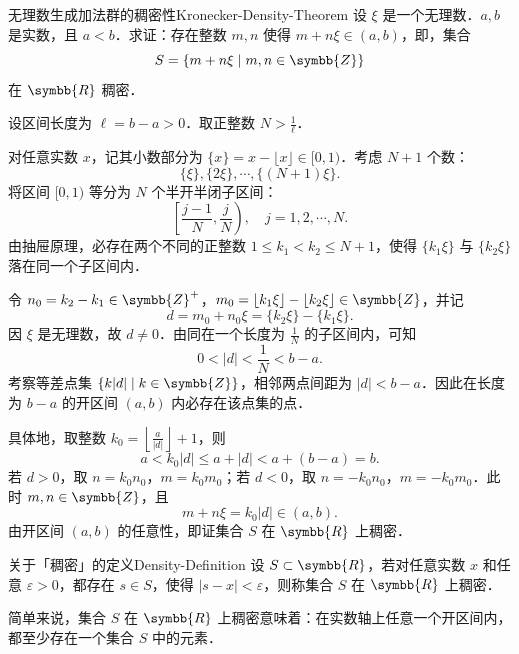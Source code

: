 \begin{problem}{无理数生成加法群的稠密性}{Kronecker-Density-Theorem}
    设 $\xi$ 是一个无理数．$a, b$ 是实数，且 $a < b$．求证：存在整数 $m, n$ 使得 $m + n\xi \in (a, b)$，即，集合
    \begin{equation}
        S = \{m + n\xi \mid m, n \in \symbb{Z}\}
    \end{equation}
    在 $\symbb{R}$ 稠密．
\end{problem}

\begin{myproof}
    设区间长度为 $\ell = b - a > 0$．取正整数 $N > \frac{1}{\ell}$．

    对任意实数 $x$，记其小数部分为 $\{x\} = x - \lfloor x \rfloor \in [0, 1)$．考虑 $N + 1$ 个数：
    \begin{equation}
        \{\xi\}, \{2\xi\}, \cdots, \{(N+1)\xi\}.
    \end{equation}
    将区间 $[0, 1)$ 等分为 $N$ 个半开半闭子区间：
    \begin{equation}
        \left[ \frac{j-1}{N}, \frac{j}{N} \right), \quad j = 1, 2, \cdots, N.
    \end{equation}
    由抽屉原理，必存在两个不同的正整数 $1 \leqslant k_1 < k_2 \leqslant N + 1$，使得 $\{k_1 \xi\}$ 与 $\{k_2 \xi\}$ 落在同一个子区间内．

    令 $n_0 = k_2 - k_1 \in \symbb{Z}^+$，$m_0 = \lfloor k_1 \xi \rfloor - \lfloor k_2 \xi \rfloor \in \symbb{Z}$，并记
    \begin{equation}
        d = m_0 + n_0 \xi = \{k_2 \xi\} - \{k_1 \xi\}.
    \end{equation}
    因 $\xi$ 是无理数，故 $d \neq 0$．由同在一个长度为 $\frac{1}{N}$ 的子区间内，可知
    \begin{equation}
        0 < |d| < \frac{1}{N} < b - a.
    \end{equation}
    考察等差点集 $\{k |d| \mid k \in \symbb{Z}\}$，相邻两点间距为 $|d| < b - a$．因此在长度为 $b - a$ 的开区间 $(a, b)$ 内必存在该点集的点．

    具体地，取整数 $k_0 = \left\lfloor \frac{a}{|d|} \right\rfloor + 1$，则
    \begin{equation}
        a < k_0 |d| \leqslant a + |d| < a + (b - a) = b.
    \end{equation}
    若 $d > 0$，取 $n = k_0 n_0$，$m = k_0 m_0$；若 $d < 0$，取 $n = -k_0 n_0$，$m = -k_0 m_0$．此时 $m, n \in \symbb{Z}$，且
    \begin{equation}
        m + n\xi = k_0 |d| \in (a, b).
    \end{equation}
    由开区间 $(a, b)$ 的任意性，即证集合 $S$ 在 $\symbb{R}$ 上稠密．
\end{myproof}

\begin{note}{关于「稠密」的定义}{Density-Definition}
    设 $S \subset \symbb{R}$，若对任意实数 $x$ 和任意 $\varepsilon > 0$，都存在 $s \in S$，使得 $|s - x| < \varepsilon$，则称集合 $S$ 在 $\symbb{R}$ 上稠密．

    简单来说，集合 $S$ 在 $\symbb{R}$ 上稠密意味着：在实数轴上任意一个开区间内，都至少存在一个集合 $S$ 中的元素．
\end{note}

\endinput
